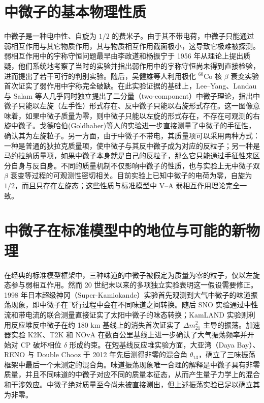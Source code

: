 \section{中微子的基本物理性质}

中微子是一种电中性、自旋为 $1/2$ 的费米子。由于其不带电荷，中微子只能通过弱相互作用与其它物质作用，其与物质相互作用截面极小，这导致它极难被探测。弱相互作用中的宇称守恒问题最早由李政道和杨振宁于 1956 年从理论上提出质疑，他们系统地考察了当时的实验并指出弱作用中的宇称守恒尚未得到直接检验，进而提出了若干可行的判别实验\cite{LeeYang1956Parity}。随后，吴健雄等人利用极化 $^{60}$Co 核 $\beta$ 衰变实验首次证实了弱作用中宇称完全破缺\cite{Wu1957Parity}。在此实验证据的基础上，Lee--Yang、Landau 与 Salam 等人几乎同时独立提出了二分量（two-component）中微子理论，指出中微子只能以左旋（左手性）形式存在、反中微子只能以右旋形式存在\cite{LeeYang1957TwoComponent,Landau1957TwoComponent,Salam1957TwoComponent}。这一图像意味着，如果中微子质量为零，则中微子只能以左旋的形式存在，不存在可观测的右旋中微子。戈德哈伯(Goldhaber)等人的实验进一步直接测量了中微子的手征性，确认其为左旋粒子\cite{Goldhaber1958Helicity}。另一方面，由于中微子不带电，其质量项可以采用两种方式：一种是普通的狄拉克质量项，使中微子与其反中微子成为对应的反粒子；另一种是马约拉纳质量项，如果中微子本身就是自己的反粒子\cite{Majorana1937Theory}，那么它只能通过手征性来区分自身与反自身。不同的质量机制不仅影响中微子的性质，也与实验上无中微子双 $\beta$ 衰变等过程的可观测性密切相关。目前实验上已知中微子的电荷为零，自旋为 $1/2$，而且只存在左旋态；这些性质与标准模型中 V--A 弱相互作用理论完全一致\cite{Feynman1958VA}。

\section{中微子在标准模型中的地位与可能的新物理}
在经典的标准模型框架中，三种味道的中微子被假定为质量为零的粒子，仅以左旋态参与弱相互作用。然而 20 世纪末以来的多项独立实验表明这一假设需要修正。1998 年日本超级神冈（Super-Kamiokande）实验首先观测到大气中微子的味道振荡现象，即中微子在飞行过程中会在不同味道之间转换\cite{Fukuda1998Atmospheric}。随后 SNO 实验通过中性流和带电流的联合测量直接证实了太阳中微子的味态转换\cite{SNO2002Solar}；KamLAND 实验则利用反应堆反中微子在约 180 km 基线上的消失首次证实了 $\Delta m^2_{21}$ 主导的振荡\cite{KamLAND2003Reactor}。加速器实验 K2K\cite{Ahn2006_K2K}、T2K\cite{Abe2020T2K} 和 NOvA\cite{NOvA2017_Oscillation} 在数百公里基线上进一步确认了大气振荡频率并开始对 CP 破坏相位 $\delta$ 形成约束。在短基线反应堆实验方面，大亚湾（Daya Bay）\cite{An2012_DayaBayDiscovery,PhysRevLett.108.171803}、RENO\cite{Ahn2012_RENO} 与 Double Chooz\cite{Abe2012_DoubleChooz} 于 2012 年先后测得非零的混合角 $\theta_{13}$，确立了三味振荡框架中最后一个未测定的混合角。味道振荡现象唯一合理的解释是中微子具有非零质量，并且不同味道的中微子对应不同的质量本征态，从而产生量子力学上的混合和干涉效应。中微子绝对质量至今尚未被直接测出，但上述振荡实验已足以确立其为非零。


